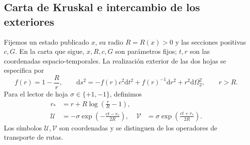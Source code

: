\subsection{Carta de Kruskal e intercambio de los exteriores}
\label{vii:vii:subsec:kruskal-dos-hojas}

Fijemos un estado publicado \(x\), su radio \(R=R(x)>0\) y las
secciones positivas \(c,G\). En la carta que sigue, \(x,R,c,G\)
son parámetros fijos; \(t,r\) son las coordenadas espacio-temporales.
La realización exterior de las dos hojas se especifica por
\begin{equation}
 f(r)=1-\frac Rr,\qquad
 \mathrm ds^2=-f(r)c^2\mathrm dt^2+f(r)^{-1}\mathrm dr^2
                 +r^2\mathrm d\Omega_2^2,\qquad r>R.
 \label{vii:vii:eq:metrica-exterior}
\end{equation}
Para el lector de hoja \(\sigma\in\{+1,-1\}\), definimos
\begin{align}
 r_*&=r+R\log\left(\frac rR-1\right),\\
 \mathcal U&=-\sigma\exp\left(-\frac{ct-r_*}{2R}\right),&
 \mathcal V&=\sigma\exp\left(\frac{ct+r_*}{2R}\right).
 \label{vii:vii:eq:carta-kruskal}
\end{align}
Los símbolos \(\mathcal U,\mathcal V\) son coordenadas y se
distinguen de los operadores de transporte de rutas.

